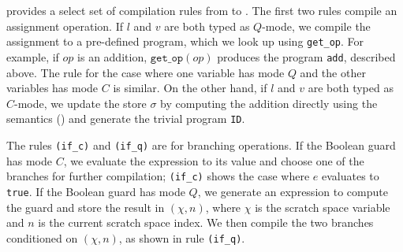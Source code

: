 
 provides a select set of compilation rules from \vqimp to \vqir.
The first two rules compile an assignment operation. 
If $l$ and $v$ are both typed as $Q$-mode, we compile the assignment to a pre-defined \vqir program, which we look up using \texttt{get\_op}. 
For example, if $op$ is an addition, $\texttt{get\_op}(op)$ produces the \vqir program \texttt{add}, described above.
The rule for the case where one variable has mode $Q$ and the other variables has mode $C$ is similar.
On the other hand, if $l$ and $v$ are both typed as $C$-mode, we update the store $\sigma$ by computing the addition directly using the \vqimp semantics () and generate the trivial \oqasm program \texttt{ID}.

The rules \texttt{(if\_c)} and \texttt{(if\_q)} are for branching operations. If the Boolean guard has mode $C$, we evaluate the expression to its value and choose one of the branches for further compilation; \texttt{(if\_c)} shows the case where $e$ evaluates to \texttt{true}. 
If the Boolean guard has mode $Q$, we generate an \vqir expression to compute the guard and store the result in $(\chi,n)$, where $\chi$ is the scratch space variable and $n$ is the current scratch space index.
We then compile the two branches conditioned on $(\chi,n)$, as shown in rule \texttt{(if\_q)}. 

